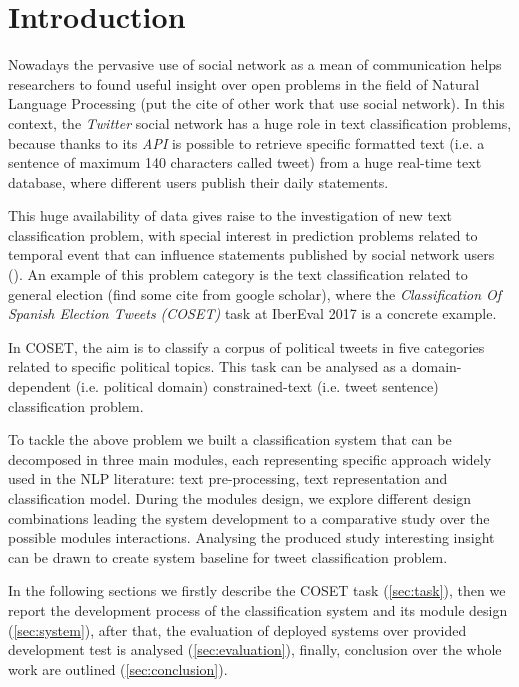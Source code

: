 \section{Introduction} \label{sec:introduction}

Nowadays the pervasive use of social network as a mean of communication helps researchers to found useful insight over open problems in the field of Natural Language Processing (put the cite of other work that use social network). In this context, the \emph{Twitter} social network has a huge role in text classification problems, because thanks to its \emph{API} is possible to retrieve specific formatted text (i.e. a sentence of maximum 140 characters called tweet) from a huge real-time text database, where different users publish their daily statements.

This huge availability of data gives raise to the investigation of new text classification problem, with special interest in prediction problems related to temporal event that can influence statements published by social network users (). An example of this problem category is the text classification related to general election (find some cite from google scholar), where the  \emph{Classification Of Spanish Election Tweets (COSET)} task at IberEval 2017 is a concrete example. 

In COSET, the aim is to classify a corpus of political tweets in five categories related to specific political topics. This task can be analysed as a domain-dependent (i.e. political domain) constrained-text (i.e. tweet sentence) classification problem.

To tackle the above problem we built a classification system that can be decomposed in three main modules, each representing specific approach widely used in the NLP literature: text pre-processing, text representation and classification model.
During the modules design, we explore different design combinations leading the system development to a comparative study over the possible modules interactions.
Analysing the produced study interesting insight can be drawn to create system baseline for tweet classification problem.

In the following sections we firstly describe the COSET task (\cref{sec:task}), then we report the development process of the classification system and its module design (\cref{sec:system}), after that, the evaluation of deployed systems over provided development test is analysed (\cref{sec:evaluation}), finally, conclusion over the whole work are outlined (\cref{sec:conclusion}).



